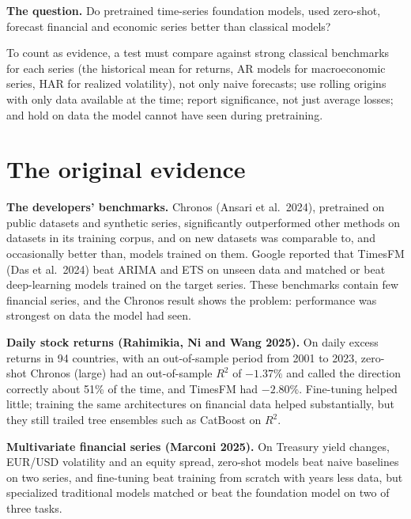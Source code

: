 \begin{callout}
\textbf{The question.} Do pretrained time-series foundation models, used zero-shot, forecast financial and economic series better than classical models?
\end{callout}

To count as evidence, a test must compare against strong classical benchmarks for each series (the historical mean for returns, AR models for macroeconomic series, HAR for realized volatility), not only naive forecasts; use rolling origins with only data available at the time; report significance, not just average losses; and hold on data the model cannot have seen during pretraining.

\section{The original evidence}
\label{sec:21-evidence}

\textbf{The developers' benchmarks.} Chronos (Ansari et al.\ 2024), pretrained on public datasets and synthetic series, significantly outperformed other methods on datasets in its training corpus, and on new datasets was comparable to, and occasionally better than, models trained on them. Google reported that TimesFM (Das et al.\ 2024) beat ARIMA and ETS on unseen data and matched or beat deep-learning models trained on the target series. These benchmarks contain few financial series, and the Chronos result shows the  problem: performance was strongest on data the model had seen.

\textbf{Daily stock returns (Rahimikia, Ni and Wang 2025).} On daily excess returns in 94 countries, with an out-of-sample period from 2001 to 2023, zero-shot Chronos (large) had an out-of-sample $R^2$ of $-1.37\%$ and called the direction correctly about 51\% of the time, and TimesFM had $-2.80\%$. Fine-tuning helped little; training the same architectures on financial data helped substantially, but they still trailed tree ensembles such as CatBoost on $R^2$.

\textbf{Multivariate financial series (Marconi 2025).} On Treasury yield changes, EUR/USD volatility and an equity spread, zero-shot models beat naive baselines on two series, and fine-tuning beat training from scratch with years less data, but specialized traditional models matched or beat the foundation model on two of three tasks.

